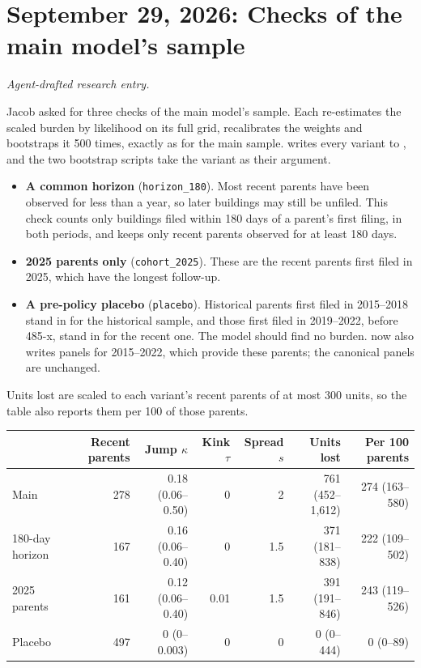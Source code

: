 \clearpage
\section*{September 29, 2026: Checks of the main model's sample}
\textit{Agent-drafted research entry.}

Jacob asked for three checks of the main model's sample. Each re-estimates the
scaled burden by likelihood on its full grid, recalibrates the weights and
bootstraps it 500 times, exactly as for the main sample.
 writes every variant to
, and the two bootstrap scripts take the
variant as their argument.
\begin{itemize}
\item \textbf{A common horizon} (\texttt{horizon\_180}). Most recent parents
  have been observed for less than a year, so later buildings may still be
  unfiled. This check counts only buildings filed within 180 days of a parent's
  first filing, in both periods, and keeps only recent parents observed for at
  least 180 days.
\item \textbf{2025 parents only} (\texttt{cohort\_2025}). These are the recent
  parents first filed in 2025, which have the longest follow-up.
\item \textbf{A pre-policy placebo} (\texttt{placebo}). Historical parents
  first filed in 2015--2018 stand in for the historical sample, and those
  first filed in 2019--2022, before 485-x, stand in for the recent one. The
  model should find no burden.  now also writes
  panels for 2015--2022, which provide these parents; the canonical panels are
  unchanged.
\end{itemize}

Units lost are scaled to each variant's recent parents of at most 300 units,
so the table also reports them per 100 of those parents.

\begin{center}
\small
\begin{tabular}{lrrrrrr}
\hline
 & Recent parents & Jump $\kappa$ & Kink $\tau$ & Spread $s$ & Units lost & Per 100 parents \\
\hline
Main & 278 & 0.18 (0.06--0.50) & 0 & 2 & 761 (452--1,612) & 274 (163--580) \\
180-day horizon & 167 & 0.16 (0.06--0.40) & 0 & 1.5 & 371 (181--838) & 222 (109--502) \\
2025 parents & 161 & 0.12 (0.06--0.40) & 0.01 & 1.5 & 391 (191--846) & 243 (119--526) \\
Placebo & 497 & 0 (0--0.003) & 0 & 0 & 0 (0--444) & 0 (0--89) \\
\hline
\end{tabular}
\end{center}

